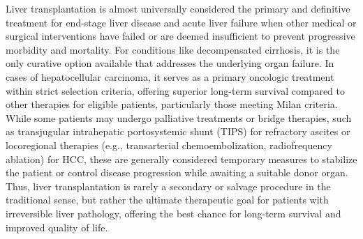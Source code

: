 Liver transplantation is almost universally considered the primary and definitive treatment for end-stage liver disease and acute liver failure when other medical or surgical interventions have failed or are deemed insufficient to prevent progressive morbidity and mortality. For conditions like decompensated cirrhosis, it is the only curative option available that addresses the underlying organ failure. In cases of hepatocellular carcinoma, it serves as a primary oncologic treatment within strict selection criteria, offering superior long-term survival compared to other therapies for eligible patients, particularly those meeting Milan criteria. While some patients may undergo palliative treatments or bridge therapies, such as transjugular intrahepatic portosystemic shunt (TIPS) for refractory ascites or locoregional therapies (e.g., transarterial chemoembolization, radiofrequency ablation) for HCC, these are generally considered temporary measures to stabilize the patient or control disease progression while awaiting a suitable donor organ. Thus, liver transplantation is rarely a secondary or salvage procedure in the traditional sense, but rather the ultimate therapeutic goal for patients with irreversible liver pathology, offering the best chance for long-term survival and improved quality of life.

